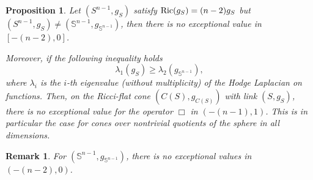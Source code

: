 \documentclass[a4paper,11pt,reqno]{amsart}
\newtheorem{prop}[defn]{Proposition}
\newtheorem{rk}[defn]{Remark}
\def\Ric{\mathop{\rm Ric}\nolimits}
\def\Ric{\mathop{\rm Ric}\nolimits}
\numberwithin{equation}{section}
\begin{document}
	
	\begin{prop}\label{bornes exception quotients}
		Let $(S^{n-1},g_S)$ satisfy $\Ric(g_S)= (n-2)g_S$ but $(S^{n-1},g_S)\neq (\mathbb{S}^{n-1},g_{\mathbb{S}^{n-1}})$, then there is no exceptional value in $[-(n-2),0]$. 
		
		Moreover, if the following inequality holds
		$$\lambda_1(g_S)\geq \lambda_2(g_{\mathbb{S}^{n-1}}),$$
		where $\lambda_i$ is the $i$-th eigenvalue (without multiplicity) of the Hodge Laplacian on functions. Then, on the Ricci-flat cone $(C(S),g_{C(S)})$ with link $(S,g_S)$, there is no exceptional value for the operator $\Box$ in $(-(n-1),1)$. This is in particular the case for cones over nontrivial quotients of the sphere in all dimensions.\\
	\end{prop}
	\begin{rk}
		For $(\mathbb{S}^{n-1},g_{\mathbb{S}^{n-1}})$, there is no exceptional values in $(-(n-2),0)$.
	\end{rk}
\end{document}
